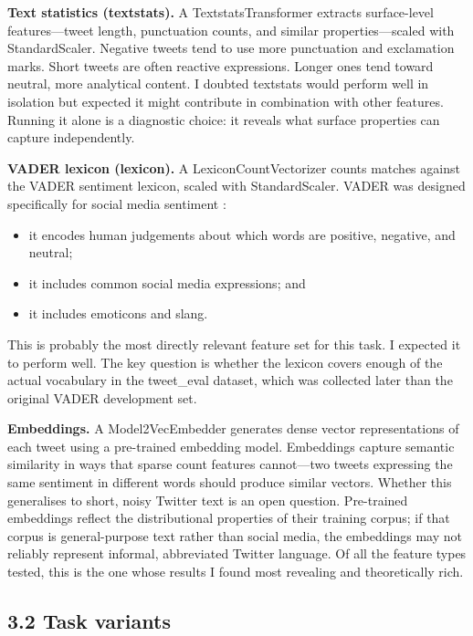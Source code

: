 \documentclass[12pt]{article}
\begin{document}
\textbf{Text statistics (textstats).} A TextstatsTransformer extracts surface-level features---tweet length, punctuation counts, and similar properties---scaled with StandardScaler. Negative tweets tend to use more punctuation and exclamation marks. Short tweets are often reactive expressions. Longer ones tend toward neutral, more analytical content. I doubted textstats would perform well in isolation but expected it might contribute in combination with other features. Running it alone is a diagnostic choice: it reveals what surface properties can capture independently.

\textbf{VADER lexicon (lexicon).} A LexiconCountVectorizer counts matches against the VADER sentiment lexicon, scaled with StandardScaler. VADER was designed specifically for social media sentiment \citep{hutto2014vader}:

\begin{itemize}

  \item it encodes human judgements about which words are positive, negative, and neutral;

  \item it includes common social media expressions; and

  \item it includes emoticons and slang.

\end{itemize} This is probably the most directly relevant feature set for this task. I expected it to perform well. The key question is whether the lexicon covers enough of the actual vocabulary in the tweet\_eval dataset, which was collected later than the original VADER development set.

\textbf{Embeddings.} A Model2VecEmbedder generates dense vector representations of each tweet using a pre-trained embedding model. Embeddings capture semantic similarity in ways that sparse count features cannot---two tweets expressing the same sentiment in different words should produce similar vectors. Whether this generalises to short, noisy Twitter text is an open question. Pre-trained embeddings reflect the distributional properties of their training corpus; if that corpus is general-purpose text rather than social media, the embeddings may not reliably represent informal, abbreviated Twitter language. Of all the feature types tested, this is the one whose results I found most revealing and theoretically rich.



\subsection*{3.2 Task variants}
\end{document}
